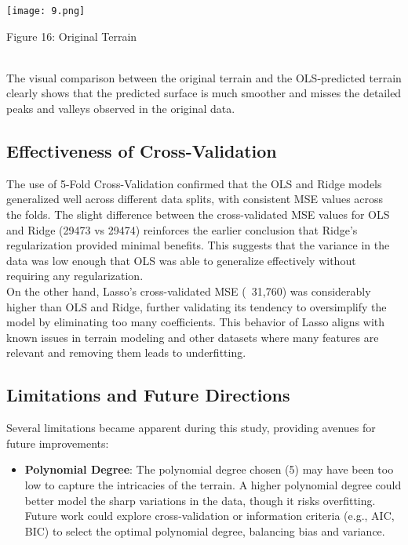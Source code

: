 \documentclass{article}
\begin{document}
\begin{enumerate}
\texttt{[image: 9.png]}
\caption{Figure 16: Original Terrain}
\label{fig:enter-label}\\


The visual comparison between the original terrain and the OLS-predicted terrain clearly shows that the predicted surface is much smoother and misses the detailed peaks and valleys observed in the original data. \cite{bishop2006pattern}



\subsection{Effectiveness of Cross-Validation}

The use of 5-Fold Cross-Validation confirmed that the OLS and Ridge models generalized well across different data splits, with consistent MSE values across the folds. The slight difference between the cross-validated MSE values for OLS and Ridge (29473 vs 29474) reinforces the earlier conclusion that Ridge's regularization provided minimal benefits. This suggests that the variance in the data was low enough that OLS was able to generalize effectively without requiring any regularization.\\

On the other hand, Lasso’s cross-validated MSE (~31,760) was considerably higher than OLS and Ridge, further validating its tendency to oversimplify the model by eliminating too many coefficients. This behavior of Lasso aligns with known issues in terrain modeling and other datasets where many features are relevant and removing them leads to underfitting.

\subsection{Limitations and Future Directions}

Several limitations became apparent during this study, providing avenues for future improvements:

\begin{itemize}
    \item \textbf{Polynomial Degree}: The polynomial degree chosen (5) may have been too low to capture the intricacies of the terrain. A higher polynomial degree could better model the sharp variations in the data, though it risks overfitting. Future work could explore cross-validation or information criteria (e.g., AIC, BIC) to select the optimal polynomial degree, balancing bias and variance.
    

\end{itemize}
\end{enumerate}
\end{document}

